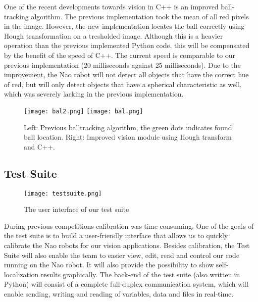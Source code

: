 \documentclass[11pt]{llncs}
\begin{document}
One of the recent developments towards vision in C++ is an improved ball-tracking algorithm. The previous implementation took the mean of all red pixels in the image. However, the new implementation locates the ball correctly using Hough transformation on a tresholded image. Although this is a heavier operation than the previous implemented Python code, this will be compensated by the benefit of the speed of C++. The current speed is comparable to our previous implementation (20 milliseconds against 25 milliseconds). Due to the improvement, the Nao robot will not detect all objects that have the correct hue of red, but will only detect objects that have a spherical characteristic as well, which was severely lacking in the previous implementation.
\begin{figure}[!ht]
  \centering
  \texttt{[image: bal2.png]}
  \texttt{[image: bal.png]}
  \caption{Left: Previous balltracking algorithm, the green dots indicates found ball location. Right: Improved vision module using Hough transform and C++.}
\label{fig:balls}
\end{figure}

\newpage

\subsection{Test Suite}

\begin{wrapfigure}{r}{0.31\textwidth}
  \begin{center}
    \vspace{-0.25cm}
    \texttt{[image: testsuite.png]}
	\caption{The user interface of our test suite}
  \end{center}
\end{wrapfigure}

During previous competitions calibration was time consuming. One of the goals of the test suite is to build a user-friendly interface that allows us to quickly calibrate the Nao robots for our vision applications. Besides calibration, the Test Suite will also enable the team to easier view, edit, read and control our code running on the Nao robot. It will also provide the possibility to show self-localization results graphically.
The back-end of the test suite (also written in Python) will consist of a complete full-duplex communication system, which will enable sending, writing and reading of variables, data and files in real-time.
\end{document}
